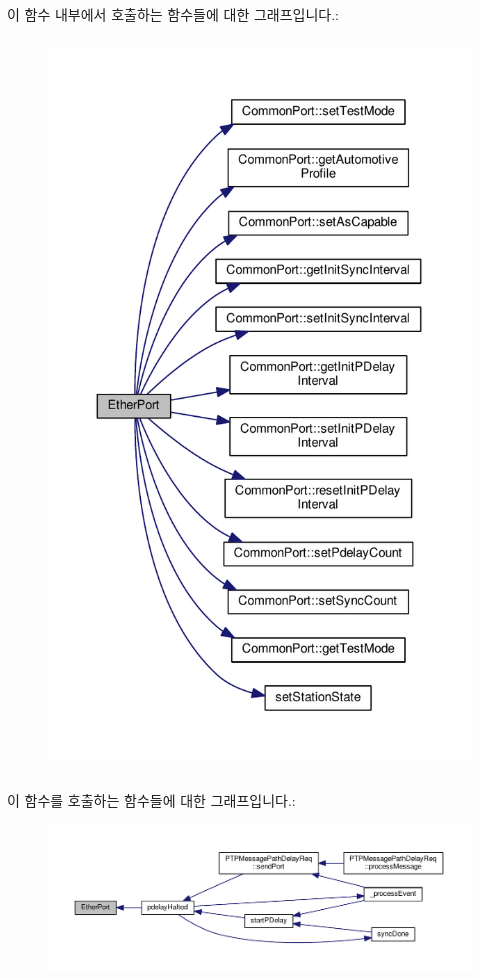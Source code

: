 이 함수 내부에서 호출하는 함수들에 대한 그래프입니다.\+:
\nopagebreak
\begin{figure}[H]
\begin{center}
\leavevmode
\includegraphics[height=550pt]{class_ether_port_acebae3719a05786d237ee8b82329b664_cgraph}
\end{center}
\end{figure}




이 함수를 호출하는 함수들에 대한 그래프입니다.\+:
\nopagebreak
\begin{figure}[H]
\begin{center}
\leavevmode
\includegraphics[width=350pt]{class_ether_port_acebae3719a05786d237ee8b82329b664_icgraph}
\end{center}
\end{figure}




